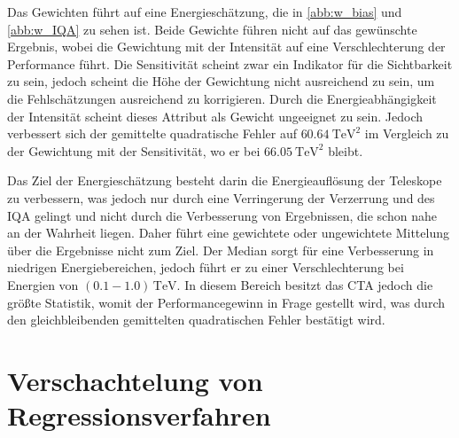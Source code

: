 Das Gewichten führt auf eine Energieschätzung, die in \autoref{abb:w_bias} und \autoref{abb:w_IQA} zu sehen ist.
Beide Gewichte führen nicht auf das gewünschte Ergebnis, wobei die Gewichtung mit der Intensität auf eine Verschlechterung der Performance führt.
Die Sensitivität scheint zwar ein Indikator für die Sichtbarkeit zu sein, jedoch scheint die Höhe der Gewichtung nicht ausreichend zu sein, um
die Fehlschätzungen ausreichend zu korrigieren.
Durch die Energieabhängigkeit der Intensität scheint dieses Attribut als Gewicht ungeeignet zu sein.
Jedoch verbessert sich der gemittelte quadratische Fehler auf $\SI{60.64}{\tera\eV\squared}$ im Vergleich zu der Gewichtung mit der Sensitivität, wo er bei
$\SI{66.05}{\tera\eV\squared}$ bleibt.

Das Ziel der Energieschätzung besteht darin die Energieauflösung der Teleskope zu verbessern, was jedoch nur durch eine Verringerung der
Verzerrung und des IQA gelingt und nicht durch die Verbesserung von Ergebnissen, die schon nahe an der Wahrheit liegen.
Daher führt eine gewichtete oder ungewichtete Mittelung über die Ergebnisse nicht zum Ziel.
Der Median sorgt für eine Verbesserung in niedrigen Energiebereichen, jedoch führt er zu einer Verschlechterung bei Energien von $(\num{0.1}-\num{1.0})\,\si{\tera\eV}$.
In diesem Bereich besitzt das CTA jedoch die größte Statistik, womit der Performancegewinn in Frage gestellt wird, was durch den
gleichbleibenden gemittelten quadratischen Fehler bestätigt wird.


\section{Verschachtelung von Regressionsverfahren}
\label{sec:nest}

